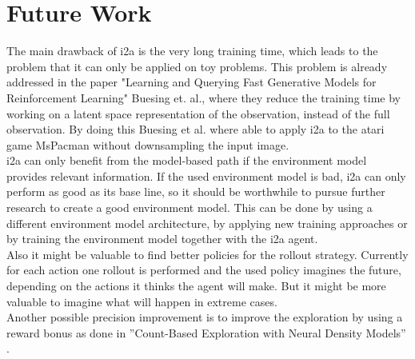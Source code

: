 \section{Future Work}

The main drawback of i2a is the very long training time, which leads to the problem that it can only be applied on toy problems. This problem is already addressed in the paper "Learning and Querying Fast Generative Models for Reinforcement Learning" \cite{LearningAndQueryingFasGenerativeModels} Buesing et. al., where they reduce the training time by working on a latent space representation of the observation, instead of the full observation. By doing this Buesing et al. where able to apply i2a to the atari game MsPacman without downsampling the input image.\\


i2a can only benefit from the model-based path if the environment model provides relevant information. 
If the used environment model is bad, i2a can only perform as good as its base line, so it should be worthwhile to pursue further research to create a good environment model.
This can be done by using a different environment model architecture, by applying new training approaches or by training the environment model together with the i2a agent.\\

Also it might be valuable to find better policies for the rollout strategy. Currently for each action one rollout is performed and the used policy imagines the future, depending on the actions it thinks the agent will make. But it might be more valuable to imagine what will happen in extreme cases.\\

Another possible precision improvement is to improve the exploration by using a reward bonus as done in ”Count-Based Exploration with Neural Density Models” \cite{CountBasedExploration}.



